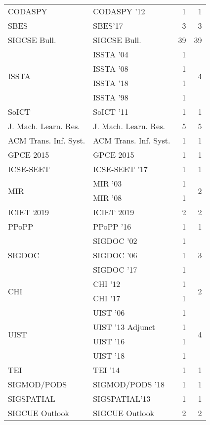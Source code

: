 \begin{table*}[t]
\begin{tabular}{llrr}
\multirow{1}{*}{CODASPY } & CODASPY '12 & 1 & \multirow{1}{*}{1}\\
\multirow{1}{*}{SBES} & SBES'17 & 3 & \multirow{1}{*}{3}\\
\multirow{1}{*}{SIGCSE Bull.} & SIGCSE Bull. & 39 & \multirow{1}{*}{39}\\
\multirow{4}{*}{ISSTA } & ISSTA '04 & 1 & \multirow{4}{*}{4}\\
& ISSTA '08 & 1 &\\
& ISSTA '18 & 1 &\\
& ISSTA '98 & 1 &\\
\multirow{1}{*}{SoICT } & SoICT '11 & 1 & \multirow{1}{*}{1}\\
\multirow{1}{*}{J. Mach. Learn. Res.} & J. Mach. Learn. Res. & 5 & \multirow{1}{*}{5}\\
\multirow{1}{*}{ACM Trans. Inf. Syst.} & ACM Trans. Inf. Syst. & 1 & \multirow{1}{*}{1}\\
\multirow{1}{*}{GPCE 2015} & GPCE 2015 & 1 & \multirow{1}{*}{1}\\
\multirow{1}{*}{ICSE-SEET } & ICSE-SEET '17 & 1 & \multirow{1}{*}{1}\\
\multirow{2}{*}{MIR } & MIR '03 & 1 & \multirow{2}{*}{2}\\
& MIR '08 & 1 &\\
\multirow{1}{*}{ICIET 2019} & ICIET 2019 & 2 & \multirow{1}{*}{2}\\
\multirow{1}{*}{PPoPP } & PPoPP '16 & 1 & \multirow{1}{*}{1}\\
\multirow{3}{*}{SIGDOC } & SIGDOC '02 & 1 & \multirow{3}{*}{3}\\
& SIGDOC '06 & 1 &\\
& SIGDOC '17 & 1 &\\
\multirow{2}{*}{CHI } & CHI '12 & 1 & \multirow{2}{*}{2}\\
& CHI '17 & 1 &\\
\multirow{4}{*}{UIST } & UIST '06 & 1 & \multirow{4}{*}{4}\\
& UIST '13 Adjunct & 1 &\\
& UIST '16 & 1 &\\
& UIST '18 & 1 &\\
\multirow{1}{*}{TEI } & TEI '14 & 1 & \multirow{1}{*}{1}\\
\multirow{1}{*}{SIGMOD/PODS } & SIGMOD/PODS '18 & 1 & \multirow{1}{*}{1}\\
\multirow{1}{*}{SIGSPATIAL} & SIGSPATIAL'13 & 1 & \multirow{1}{*}{1}\\
\multirow{1}{*}{SIGCUE Outlook} & SIGCUE Outlook & 2 & \multirow{1}{*}{2}\\

\end{tabular}
\end{table*}
